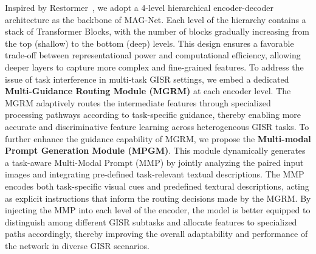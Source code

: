 \documentclass[lettersize,journal]{IEEEtran}
\begin{document}
Inspired by Restormer~\cite{allinone_zamir2022restormer}, we adopt a 4-level hierarchical encoder-decoder architecture as the backbone of MAG-Net. Each level of the hierarchy contains a stack of Transformer Blocks, with the number of blocks gradually increasing from the top (shallow) to the bottom (deep) levels. This design ensures a favorable trade-off between representational power and computational efficiency, allowing deeper layers to capture more complex and fine-grained features.
To address the issue of task interference in multi-task GISR settings, we embed a dedicated \textbf{Multi-Guidance Routing Module (MGRM)} at each encoder level. The MGRM adaptively routes the intermediate features through specialized processing pathways according to task-specific guidance, thereby enabling more accurate and discriminative feature learning across heterogeneous GISR tasks.
To further enhance the guidance capability of MGRM, we propose the \textbf{Multi-modal Prompt Generation Module (MPGM)}. This module dynamically generates a task-aware Multi-Modal Prompt (MMP) by jointly analyzing the paired input images and integrating pre-defined task-relevant textual descriptions. The MMP encodes both task-specific visual cues and predefined textural descriptions, acting as explicit instructions that inform the routing decisions made by the MGRM.
By injecting the MMP into each level of the encoder, the model is better equipped to distinguish among different GISR subtasks and allocate features to specialized paths accordingly, thereby improving the overall adaptability and performance of the network in diverse GISR scenarios.



\end{document}
